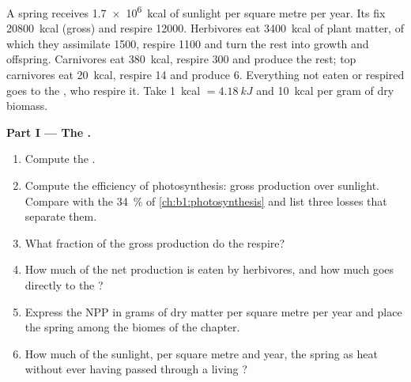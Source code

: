 \begin{problem}
\label{pb:b1:ecosystem-organization:1}
A spring receives \qty{1.7e6}{kcal} of sunlight per square metre per
year. Its  fix \qty{20800}{kcal} (gross) and respire
\qty{12000}{}. Herbivores eat \qty{3400}{kcal} of plant matter, of
which they assimilate \qty{1500}{}, respire \qty{1100}{} and turn the
rest into growth and offspring. Carnivores eat \qty{380}{kcal}, respire
\qty{300}{} and produce the rest; top carnivores eat \qty{20}{kcal},
respire \qty{14}{} and produce \qty{6}{}. Everything not eaten or
respired goes to the , who respire it. Take
\qty{1}{kcal} $= \qty{4.18}{kJ}$ and \qty{10}{kcal} per gram of dry
biomass.

\medskip
\noindent\textbf{Part I --- The .}
\begin{enumerate}
  \item Compute the .
  \item Compute the efficiency of photosynthesis: gross production
        over sunlight. Compare with the \qty{34}{\%} of
        \cref{ch:b1:photosynthesis} and list three losses that
        separate them.
  \item What fraction of the gross production do the 
        respire?
  \item How much of the net production is eaten by herbivores, and
        how much goes directly to the ?
  \item Express the NPP in grams of dry matter per square metre per
        year and place the spring among the biomes of the chapter.
  \item How much of the sunlight, per square metre and year,  the
        spring as heat without ever having passed through a living
        ?
\end{enumerate}


\end{problem}
